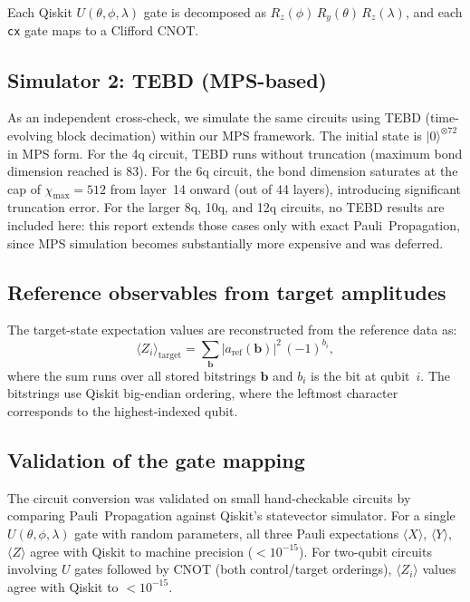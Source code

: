 \documentclass[11pt]{article}
\begin{document}
Each Qiskit $U(\theta,\phi,\lambda)$ gate is decomposed as $R_z(\phi)\,R_y(\theta)\,R_z(\lambda)$, and each \texttt{cx} gate maps to a Clifford CNOT.

\subsection{Simulator 2: TEBD (MPS-based)}

As an independent cross-check, we simulate the same circuits using TEBD (time-evolving block decimation) within our MPS framework.
The initial state is $|0\rangle^{\otimes 72}$ in MPS form.
For the 4q circuit, TEBD runs without truncation (maximum bond dimension reached is 83).
For the 6q circuit, the bond dimension saturates at the cap of $\chi_{\max}=512$ from layer~14 onward (out of 44 layers), introducing significant truncation error.
For the larger 8q, 10q, and 12q circuits, no TEBD results are included here: this report extends those cases only with exact Pauli~Propagation, since MPS simulation becomes substantially more expensive and was deferred.

\subsection{Reference observables from target amplitudes}

The target-state expectation values are reconstructed from the reference data as:
\begin{equation}
  \langle Z_i \rangle_{\mathrm{target}} = \sum_{\mathbf{b}} |a_{\mathrm{ref}}(\mathbf{b})|^2 \, (-1)^{b_i},
\end{equation}
where the sum runs over all stored bitstrings $\mathbf{b}$ and $b_i$ is the bit at qubit~$i$.
The bitstrings use Qiskit big-endian ordering, where the leftmost character corresponds to the highest-indexed qubit.

\subsection{Validation of the gate mapping}

The circuit conversion was validated on small hand-checkable circuits by comparing Pauli~Propagation against Qiskit's statevector simulator.
For a single $U(\theta,\phi,\lambda)$ gate with random parameters, all three Pauli expectations $\langle X\rangle$, $\langle Y\rangle$, $\langle Z\rangle$ agree with Qiskit to machine precision ($< 10^{-15}$).
For two-qubit circuits involving $U$ gates followed by CNOT (both control/target orderings), $\langle Z_i\rangle$ values agree with Qiskit to $< 10^{-15}$.
\end{document}
